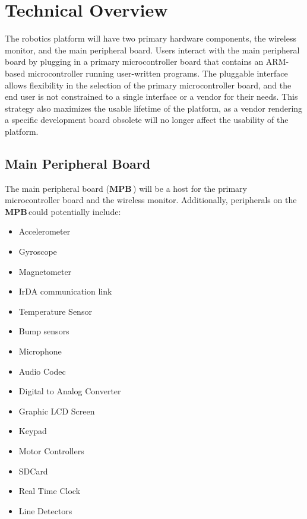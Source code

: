 \documentclass[letterpaper]{article}
\newcommand{\MPB}{\textbf{MPB}\,}
\begin{document}
\section{Technical Overview}
The robotics platform will have two primary hardware components, the wireless monitor, and the main peripheral board. Users interact with the main peripheral board by plugging in a primary microcontroller board that contains an ARM-based microcontroller running user-written programs. The pluggable interface allows flexibility in the selection of the primary microcontroller board, and the end user is not constrained to a single interface or a vendor for their needs. This strategy also maximizes the usable lifetime of the platform, as a vendor rendering a specific development board obsolete will no longer affect the usability of the platform.


\subsection{Main Peripheral Board}
The main peripheral board (\MPB) will be a host for the primary microcontroller board and the wireless monitor. Additionally, peripherals on the \MPB could potentially include:

\begin{multicols}{2}
\begin{itemize}
\item Accelerometer
\item Gyroscope
\item Magnetometer
\item IrDA communication link
\item Temperature Sensor
\item Bump sensors
\item Microphone
\item Audio Codec
\item Digital to Analog Converter
\item Graphic LCD Screen
\item Keypad
\item Motor Controllers
\item SDCard
\item Real Time Clock
\item Line Detectors
\end{itemize}
\end{multicols}
\end{document}
